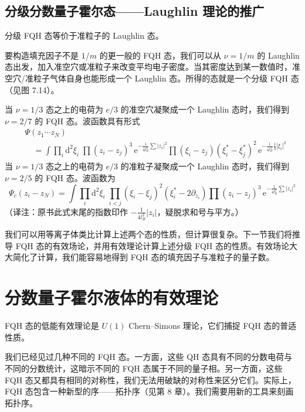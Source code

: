 
\subsection{分级分数量子霍尔态——Laughlin 理论的推广}

\begin{keypoints}
\item 分级 FQH 态等价于准粒子的 Laughlin 态。
\end{keypoints}

要构造填充因子不是 $1/m$ 的更一般的 FQH 态，我们可以从 $\nu=1/m$ 的 Laughlin 态出发，加入准空穴或准粒子来改变平均电子密度。当其密度达到某一数值时，准空穴/准粒子气体自身也能形成一个 Laughlin 态。所得的态就是一个分级 FQH 态（见图 7.14）。

当 $\nu=1/3$ 态之上的电荷为 $e/3$ 的准空穴凝聚成一个 Laughlin 态时，我们得到 $\nu=2/7$ 的 FQH 态。波函数具有形式
\begin{align*}
&\Psi(z_1\cdots z_N)\\
&\quad=\int\prod_i\mathrm{d}^2\xi_i\;\prod(z_i-z_j)^3\,\mathrm{e}^{-\frac{1}{4l_B^2}\sum|z_i|^2}\prod(\xi_i-z_j)(\xi_i^*-\xi_j^*)^2\,\mathrm{e}^{-\frac{1}{4l_B^2}\frac{1}{3}|\xi_i|^2}
\end{align*}
当 $\nu=1/3$ 态之上的电荷为 $e/3$ 的准粒子凝聚成一个 Laughlin 态时，我们得到 $\nu=2/5$ 的 FQH 态。波函数为
\begin{equation*}
\Psi_c(z_i-z_N)=\int\prod_i\mathrm{d}^2\xi_i\;\prod_{i<j}(\xi_i-\xi_j)^2(\xi_i^*-2\partial_{z_i})\prod(z_i-z_j)^3\,\mathrm{e}^{-\frac{1}{4l_B^2}\sum|z_i|^2}
\end{equation*}
（译注：原书此式末尾的指数印作 $-\frac{1}{4l_B^2}|z_i|$，疑脱求和号与平方。）

我们可以用等离子体类比计算上述两个态的性质，但计算很复杂。下一节我们将推导 FQH 态的有效场论，并用有效理论计算上述分级 FQH 态的性质。有效场论大大简化了计算，我们能容易地得到 FQH 态的填充因子与准粒子的量子数。

\section{分数量子霍尔液体的有效理论}

\begin{keypoints}
\item FQH 态的低能有效理论是 $U(1)$ Chern--Simons 理论，它们捕捉 FQH 态的普适性质。
\end{keypoints}

我们已经见过几种不同的 FQH 态。一方面，这些 QH 态具有不同的分数电荷与不同的分数统计，这暗示不同的 FQH 态属于不同的量子相。另一方面，这些 FQH 态又都具有相同的对称性，我们无法用破缺的对称性来区分它们。实际上，FQH 态包含一种新型的序——拓扑序（见第 8 章）。我们需要用新的工具来刻画拓扑序。

